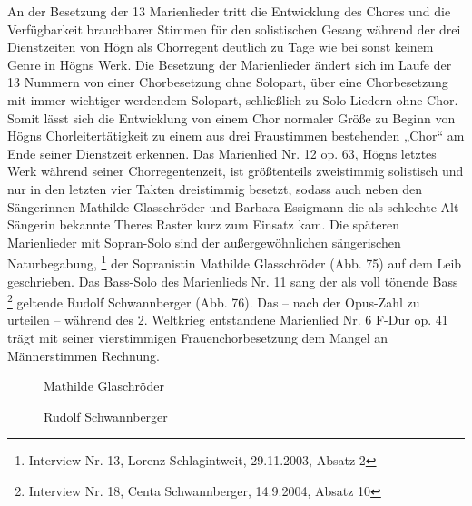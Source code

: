 An der Besetzung der 13 Marienlieder tritt die Entwicklung des Chores
und die Verfügbarkeit brauchbarer Stimmen für den solistischen Gesang
während der drei Dienstzeiten von Högn als Chorregent deutlich zu Tage
wie bei sonst keinem Genre in Högns Werk. Die Besetzung der
Marienlieder ändert sich im Laufe der 13 Nummern von einer
Chorbesetzung ohne Solopart, über eine Chorbesetzung mit immer
wichtiger werdendem Solopart, schließlich zu Solo-Liedern ohne Chor.
Somit lässt sich die Entwicklung von einem Chor normaler Größe zu
Beginn von Högns Chorleitertätigkeit zu einem aus drei Fraustimmen
bestehenden „Chor“ am Ende seiner Dienstzeit erkennen. Das Marienlied
Nr. 12 op. 63, Högns letztes Werk während seiner Chorregentenzeit, ist
größtenteils zweistimmig solistisch und nur in den letzten vier Takten
dreistimmig besetzt, sodass auch neben den Sängerinnen Mathilde
Glasschröder und Barbara Essigmann die als schlechte Alt-Sängerin
bekannte Theres Raster kurz zum Einsatz kam. Die späteren Marienlieder
mit Sopran-Solo sind der außergewöhnlichen sängerischen
Naturbegabung, \footnote{Interview Nr. 13, Lorenz Schlagintweit,
29.11.2003, Absatz 2} der Sopranistin Mathilde Glasschröder (Abb. 75)
auf dem Leib geschrieben. Das Bass-Solo des Marienlieds Nr. 11 sang der
als voll tönende Bass \footnote{Interview Nr. 18, Centa Schwannberger,
14.9.2004, Absatz 10} geltende Rudolf Schwannberger (Abb. 76). Das –
nach der Opus-Zahl zu urteilen – während des 2. Weltkrieg entstandene
Marienlied Nr. 6 F-Dur op. 41 trägt mit seiner vierstimmigen
Frauenchorbesetzung dem Mangel an Männerstimmen Rechnung.

\begin{figure}
\caption{Mathilde Glaschröder}
\end{figure}

\begin{figure}
\caption{Rudolf Schwannberger}
\end{figure}
